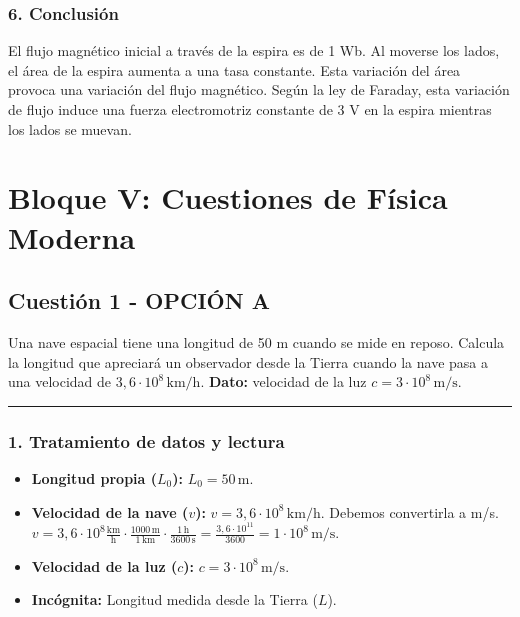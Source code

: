 \subsubsection*{6. Conclusión}
\begin{cajaconclusion}
El flujo magnético inicial a través de la espira es de 1 Wb. Al moverse los lados, el área de la espira aumenta a una tasa constante. Esta variación del área provoca una variación del flujo magnético. Según la ley de Faraday, esta variación de flujo induce una fuerza electromotriz constante de 3 V en la espira mientras los lados se muevan.
\end{cajaconclusion}

\newpage

\section{Bloque V: Cuestiones de Física Moderna}
\label{sec:mod1_2008_jun_ord}

\subsection{Cuestión 1 - OPCIÓN A}
\label{subsec:5A_2008_jun_ord}
\begin{cajaenunciado}
Una nave espacial tiene una longitud de 50 m cuando se mide en reposo. Calcula la longitud que apreciará un observador desde la Tierra cuando la nave pasa a una velocidad de $3,6\cdot10^8\,\text{km/h}$.
\textbf{Dato:} velocidad de la luz $c=3\cdot10^8\,\text{m/s}$.
\end{cajaenunciado}
\hrule

\subsubsection*{1. Tratamiento de datos y lectura}
\begin{itemize}
    \item \textbf{Longitud propia ($L_0$):} $L_0 = 50\,\text{m}$.
    \item \textbf{Velocidad de la nave ($v$):} $v = 3,6\cdot10^8\,\text{km/h}$. Debemos convertirla a m/s.
    $v = 3,6\cdot10^8 \frac{\text{km}}{\text{h}} \cdot \frac{1000\,\text{m}}{1\,\text{km}} \cdot \frac{1\,\text{h}}{3600\,\text{s}} = \frac{3,6\cdot10^{11}}{3600} = 1\cdot10^8\,\text{m/s}$.
    \item \textbf{Velocidad de la luz ($c$):} $c=3\cdot10^8\,\text{m/s}$.
    \item \textbf{Incógnita:} Longitud medida desde la Tierra ($L$).
\end{itemize}

